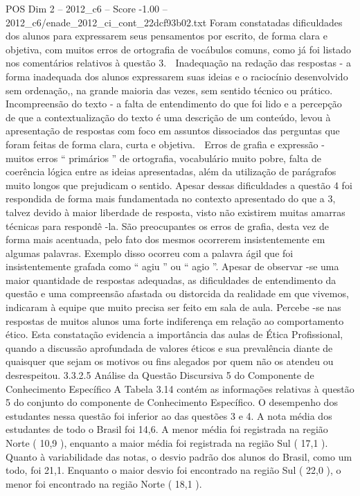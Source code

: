 \begin{textsample}{POS Dim 2 – 2012\_c6 – Score -1.00 – 2012\_c6/enade\_2012\_ci\_cont\_22dcf93b02.txt}
Foram constatadas dificuldades dos alunos para expressarem seus pensamentos por escrito, de forma clara e objetiva, com muitos erros de ortografia de vocábulos comuns, como já foi listado nos comentários relativos à questão 3.  Inadequação na redação das respostas - a forma inadequada dos alunos expressarem suas ideias e o raciocínio desenvolvido sem ordenação,, na grande maioria das vezes, sem sentido técnico ou prático.  Incompreensão do texto - a falta de entendimento do que foi lido e a percepção de que a contextualização do texto é uma descrição de um conteúdo, levou à apresentação de respostas com foco em assuntos dissociados das perguntas que foram feitas de forma clara, curta e objetiva.  Erros de grafia e expressão - muitos erros “ primários ” de ortografia, vocabulário muito pobre, falta de coerência lógica entre as ideias apresentadas, além da utilização de parágrafos muito longos que prejudicam o sentido.
Apesar dessas dificuldades a questão 4 foi respondida de forma mais fundamentada no contexto apresentado do que a 3, talvez devido à maior liberdade de resposta, visto não existirem muitas amarras técnicas para respondê -la.
São preocupantes os erros de grafia, desta vez de forma mais acentuada, pelo fato dos mesmos ocorrerem insistentemente em algumas palavras.
Exemplo disso ocorreu com a palavra ágil que foi insistentemente grafada como “ agiu ” ou “ agio ”.
Apesar de observar -se uma maior quantidade de respostas adequadas, as dificuldades de entendimento da questão e uma compreensão afastada ou distorcida da realidade em que vivemos, indicaram à equipe que muito precisa ser feito em sala de aula.
Percebe -se nas respostas de muitos alunos uma forte indiferença em relação ao comportamento ético.
Esta constatação evidencia a importância das aulas de Ética Profissional, quando a discussão aprofundada de valores éticos e sua prevalência diante de quaisquer que sejam os motivos ou fins alegados por quem não os atendeu ou desrespeitou. 3.3.2.5 Análise da Questão Discursiva 5 do Componente de Conhecimento Específico A Tabela 3.14 contém as informações relativas à questão 5 do conjunto do componente de Conhecimento Específico.
O desempenho dos estudantes nessa questão foi inferior ao das questões 3 e 4.
A nota média dos estudantes de todo o Brasil foi 14,6.
A menor média foi registrada na região Norte ( 10,9 ), enquanto a maior média foi registrada na região Sul ( 17,1 ).
Quanto à variabilidade das notas, o desvio padrão dos alunos do Brasil, como um todo, foi 21,1.
Enquanto o maior desvio foi encontrado na região Sul ( 22,0 ), o menor foi encontrado na região Norte ( 18,1 ).

\end{textsample}
